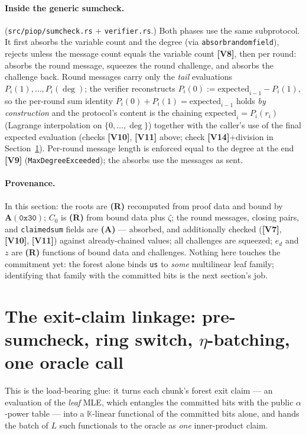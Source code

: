 \documentclass[11pt]{article}
\newcommand{\K}{\mathbb{K}}            %
\newcommand{\code}[1]{{\def\_{\textunderscore\allowbreak}\texttt{#1}}}
\newcommand{\Vc}[1]{\textbf{[V#1]}}    %
\begin{document}
\paragraph{Inside the generic sumcheck.}
(\code{src/piop/sumcheck.rs} + \code{verifier.rs}.)  Both phases use the
same subprotocol.  It first absorbs the variable count and the degree
(via \code{absorb\_random\_field}), rejects unless the message count
equals the variable count \Vc{8}, then per round: absorbs the round
message, squeezes the round challenge, and absorbs the challenge back.
Round messages carry only the \emph{tail} evaluations
$P_i(1), \dots, P_i(\deg)$; the verifier reconstructs
$P_i(0) := \mathrm{expected}_{i-1} - P_i(1)$, so the per-round sum
identity $P_i(0) + P_i(1) = \mathrm{expected}_{i-1}$ holds \emph{by
construction} and the protocol's content is the chaining
$\mathrm{expected}_i = P_i(r_i)$ (Lagrange interpolation on
$\{0,\dots,\deg\}$) together with the caller's use of the final expected
evaluation (checks \Vc{10}, \Vc{11} above; check \Vc{14}+division in
Section~\ref{sec:linkage}).  Per-round message length is enforced equal to
the degree at the end \Vc{9} (\code{MaxDegreeExceeded}); the absorbs use
the messages as sent.

\paragraph{Provenance.}  In this section: the roots are \textbf{(R)}
recomputed from proof data and bound by $\mathbf{A}(\mathtt{0x30})$;
$C_0$ is \textbf{(R)} from bound data plus $\zeta$; the round messages,
closing pairs, and \code{claimed\_sum} fields are \textbf{(A)} — absorbed,
and additionally checked (\Vc{7}, \Vc{10}, \Vc{11}) against
already-chained values; all challenges are squeezed; $e_d$ and $z$ are
\textbf{(R)} functions of bound data and challenges.  Nothing here touches
the commitment yet: the forest alone binds \code{us} to \emph{some}
multilinear leaf family; identifying that family with the committed bits
is the next section's job.

\section{The exit-claim linkage: pre-sumcheck, ring switch,
  $\eta$-batching, one oracle call}
\label{sec:linkage}

This is the load-bearing glue: it turns each chunk's forest exit claim —
an evaluation of the \emph{leaf} MLE, which entangles the committed bits
with the public $\alpha$-power table — into a $\K$-linear functional of
the committed bits alone, and hands the batch of $L$ such functionals to
the oracle as \emph{one} inner-product claim.
\end{document}
